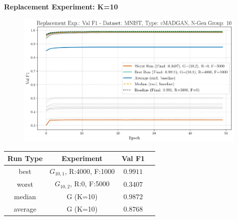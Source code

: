 \noindent\textbf{Replacement Experiment: K=10}
\begin{figure}[htbp]
	\centering
	\includegraphics[width=.85\textwidth]{abb/strat_classifier_performance/MNIST_STRATIFIED_CLASSIFIERS_cMADGAN_NEW/replacement_experiments/val_f1_score_cMADGAN_MNIST_n_gen_10_all.png}    
	\caption{ } %
	\label{fig:app_strat_class_performance_replacement__val_f1__10__example_used_1} 
\end{figure}
\vspace{-1em}
\begin{table}[H]
	\vspace{-1em}
	\centering
	\begin{tabular}{|c|c|c|c|}
		\hline
		Run Type & Experiment & Val F1 \\ \hline
		best & \(G_{10, 1}\), R:4000, F:1000 & $0.9911$\\ \hline
		worst & \(G_{10, 2}\), R:0, F:5000 & $0.3407$\\ \hline
		median & G (K=10) & $0.9872$\\ \hline
		average & G (K=10) & $0.8768$
		\\ \hline
	\end{tabular}
\end{table}
\newpage
